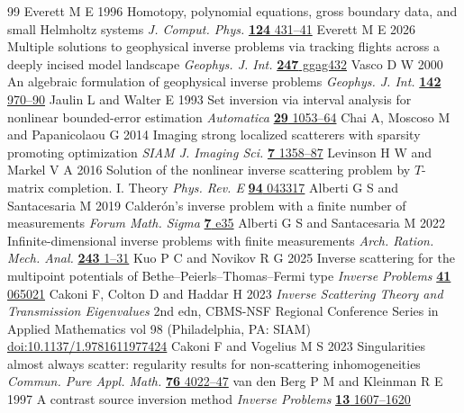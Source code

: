 \begin{thebibliography}{99}
Everett M E 1996 Homotopy, polynomial equations, gross boundary data, and small Helmholtz systems \emph{J. Comput. Phys.} \href{https://doi.org/10.1006/jcph.1996.0070}{\textbf{124} 431--41}
Everett M E 2026 Multiple solutions to geophysical inverse problems via tracking flights across a deeply incised model landscape \emph{Geophys. J. Int.} \href{https://doi.org/10.1093/gji/ggag432}{\textbf{247} ggag432}
Vasco D W 2000 An algebraic formulation of geophysical inverse problems \emph{Geophys. J. Int.} \href{https://doi.org/10.1046/j.1365-246x.2000.00188.x}{\textbf{142} 970--90}
Jaulin L and Walter E 1993 Set inversion via interval analysis for nonlinear bounded-error estimation \emph{Automatica} \href{https://doi.org/10.1016/0005-1098(93)90106-4}{\textbf{29} 1053--64}
Chai A, Moscoso M and Papanicolaou G 2014 Imaging strong localized scatterers with sparsity promoting optimization \emph{SIAM J. Imaging Sci.} \href{https://doi.org/10.1137/130943200}{\textbf{7} 1358--87}
Levinson H W and Markel V A 2016 Solution of the nonlinear inverse scattering problem by \(T\)-matrix completion. I. Theory \emph{Phys. Rev. E} \href{https://doi.org/10.1103/PhysRevE.94.043317}{\textbf{94} 043317}
Alberti G S and Santacesaria M 2019 Calder\'on's inverse problem with a finite number of measurements \emph{Forum Math. Sigma} \href{https://doi.org/10.1017/fms.2019.31}{\textbf{7} e35}
Alberti G S and Santacesaria M 2022 Infinite-dimensional inverse problems with finite measurements \emph{Arch. Ration. Mech. Anal.} \href{https://doi.org/10.1007/s00205-021-01718-4}{\textbf{243} 1--31}
Kuo P C and Novikov R G 2025 Inverse scattering for the multipoint potentials of Bethe--Peierls--Thomas--Fermi type \emph{Inverse Problems} \href{https://doi.org/10.1088/1361-6420/ade282}{\textbf{41} 065021}
Cakoni F, Colton D and Haddar H 2023 \emph{Inverse Scattering Theory and Transmission Eigenvalues} 2nd edn, CBMS-NSF Regional Conference Series in Applied Mathematics vol 98 (Philadelphia, PA: SIAM) \href{https://doi.org/10.1137/1.9781611977424}{doi:10.1137/1.9781611977424}
Cakoni F and Vogelius M S 2023 Singularities almost always scatter: regularity results for non-scattering inhomogeneities \emph{Commun. Pure Appl. Math.} \href{https://doi.org/10.1002/cpa.22117}{\textbf{76} 4022--47}
 van den Berg P M and Kleinman R E 1997 A contrast source inversion method \emph{Inverse Problems} \href{https://doi.org/10.1088/0266-5611/13/6/013}{\textbf{13} 1607--1620}

\end{thebibliography}
